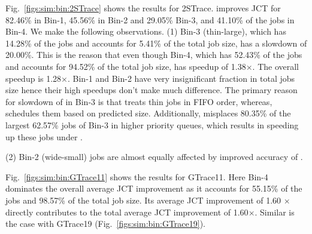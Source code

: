 Fig.~\ref{figs:sim:bin:2STrace} shows the results for 2STrace.  \slearn improves JCT
for 82.46\% in Bin-1, 45.56\% in Bin-2 and 29.05\% Bin-3,
and 41.10\%  of the jobs in Bin-4.
We make the following observations.
(1) Bin-3 (thin-large), which has 14.28\% of the jobs and accounts for 5.41\% of the total
job size, has a slowdown of 20.00\%. This is the reason that even though Bin-4,
which has 52.43\% of the jobs and accounts for 94.52\% of the total job size,
has speedup of 1.38$\times$. The overall speedup is 1.28$\times$.  Bin-1 and
Bin-2 have very insignificant fraction in total jobs size hence their high
speedups don't make much difference. The primary reason for slowdown of
\slearn in Bin-3 is that \slearn treats thin jobs in FIFO order, whereas,
\primarybase schedules them based on predicted size. Additionally, \primarybase
misplaces 80.35\% of the largest 62.57\% jobs of Bin-3 in higher priority
queues, which results in speeding up these jobs under \primarybase. 

(2) Bin-2 (wide-small) jobs are almost equally affected by improved accuracy of \slearn.


Fig.~\ref{figs:sim:bin:GTrace11} shows the results for GTrace11.
Here Bin-4 dominates the overall average JCT improvement as it accounts for
55.15\% of the jobs and 98.57\% of the total job size.  Its average JCT
improvement of 1.60 $\times$ directly contributes to the total average JCT
improvement of 1.60$\times$. Similar is the case with GTrace19
(Fig.~\ref{figs:sim:bin:GTrace19}).

